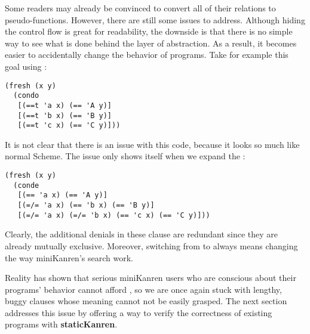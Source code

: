 Some readers may already be convinced to convert all of their relations to pseudo-functions. However, there are still some issues to address. Although hiding the control flow is great for readability, the downside is that there is no simple way to see what is done behind the layer of abstraction. As a result, it becomes easier to accidentally change the behavior of programs. Take for example this goal using :
\begin{lstlisting}
(fresh (x y)
  (condo
   [(==t 'a x) (== 'A y)]
   [(==t 'b x) (== 'B y)]
   [(==t 'c x) (== 'C y)]))
\end{lstlisting}
It is not clear that there is an issue with this code, because it looks so much like normal Scheme. The issue only shows itself when we expand the :
\begin{lstlisting}
(fresh (x y)
  (conde
   [(== 'a x) (== 'A y)]
   [(=/= 'a x) (== 'b x) (== 'B y)]
   [(=/= 'a x) (=/= 'b x) (== 'c x) (== 'C y)]))
\end{lstlisting}
Clearly, the additional denials in these  clause are redundant since they are already mutually exclusive. Moreover, switching from  to  always means changing the way miniKanren's search work.

Reality has shown that serious miniKanren users who are conscious about their programs' behavior cannot afford , so we are once again stuck with lengthy, buggy  clauses whose meaning cannot not be easily grasped. The next section addresses this issue by offering a way to verify the correctness of existing programs with \textbf{staticKanren}.